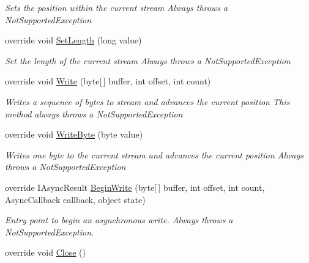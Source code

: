 \begin{DoxyCompactItemize}
\begin{DoxyCompactList}\small\item\em Sets the position within the current stream Always throws a Not\+Supported\+Exception \end{DoxyCompactList}\item 
override void \hyperlink{class_i_c_sharp_code_1_1_sharp_zip_lib_1_1_zip_1_1_compression_1_1_streams_1_1_inflater_input_stream_aff76ed02af3493e545297c262127b370}{Set\+Length} (long value)
\begin{DoxyCompactList}\small\item\em Set the length of the current stream Always throws a Not\+Supported\+Exception \end{DoxyCompactList}\item 
override void \hyperlink{class_i_c_sharp_code_1_1_sharp_zip_lib_1_1_zip_1_1_compression_1_1_streams_1_1_inflater_input_stream_aba845c76ab368c90a6e95de12e4d4d45}{Write} (byte\mbox{[}$\,$\mbox{]} buffer, int offset, int count)
\begin{DoxyCompactList}\small\item\em Writes a sequence of bytes to stream and advances the current position This method always throws a Not\+Supported\+Exception \end{DoxyCompactList}\item 
override void \hyperlink{class_i_c_sharp_code_1_1_sharp_zip_lib_1_1_zip_1_1_compression_1_1_streams_1_1_inflater_input_stream_a1bc0509214f208964facea233b8ff8f3}{Write\+Byte} (byte value)
\begin{DoxyCompactList}\small\item\em Writes one byte to the current stream and advances the current position Always throws a Not\+Supported\+Exception \end{DoxyCompactList}\item 
override I\+Async\+Result \hyperlink{class_i_c_sharp_code_1_1_sharp_zip_lib_1_1_zip_1_1_compression_1_1_streams_1_1_inflater_input_stream_a291a96116ec0c6b7de43df1de47d805d}{Begin\+Write} (byte\mbox{[}$\,$\mbox{]} buffer, int offset, int count, Async\+Callback callback, object state)
\begin{DoxyCompactList}\small\item\em Entry point to begin an asynchronous write. Always throws a Not\+Supported\+Exception. \end{DoxyCompactList}\item 
override void \hyperlink{class_i_c_sharp_code_1_1_sharp_zip_lib_1_1_zip_1_1_compression_1_1_streams_1_1_inflater_input_stream_a715fe9700f28d1b596de4414114f4c92}{Close} ()

\end{DoxyCompactItemize}
